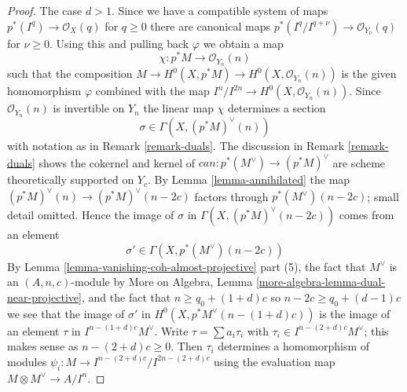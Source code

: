 \documentclass{stacks-project}
\theoremstyle{plain}
\theoremstyle{definition}
\theoremstyle{remark}
\numberwithin{equation}{subsection}
\begin{document}
\begin{proof}
The case $d > 1$. Since we have a compatible system of maps
$p^*(I^q) \to \mathcal{O}_X(q)$ for $q \geq 0$ there are canonical maps
$p^*(I^q/I^{q + \nu}) \to \mathcal{O}_{Y_\nu}(q)$ for $\nu \geq 0$.
Using this and pulling back $\varphi$ we obtain a map
$$
\chi : p^*M \longrightarrow \mathcal{O}_{Y_n}(n)
$$
such that the composition
$M \to H^0(X, p^*M) \to H^0(X, \mathcal{O}_{Y_n}(n))$
is the given homomorphism $\varphi$ combined with the
map $I^n/I^{2n} \to H^0(X, \mathcal{O}_{Y_n}(n))$.
Since $\mathcal{O}_{Y_n}(n)$ is invertible on $Y_n$ the
linear map $\chi$ determines a section
$$
\sigma \in \Gamma(X, (p^*M)^\vee(n))
$$
with notation as in Remark \ref{remark-duals}.
The discussion in Remark \ref{remark-duals} shows
the cokernel and kernel of $can : p^*(M^\vee) \to (p^*M)^\vee$
are scheme theoretically supported on $Y_c$. By
Lemma \ref{lemma-annihilated} the map
$(p^*M)^\vee(n) \to (p^*M)^\vee(n - 2c)$ factors
through $p^*(M^\vee)(n - 2c)$; small detail omitted.
Hence the image of $\sigma$ in $\Gamma(X, (p^*M)^\vee(n - 2c))$
comes from an element
$$
\sigma' \in \Gamma(X, p^*(M^\vee)(n - 2c))
$$
By Lemma \ref{lemma-vanishing-coh-almost-projective} part (5),
the fact that $M^\vee$ is an $(A, n, c)$-module by
More on Algebra, Lemma \ref{more-algebra-lemma-dual-near-projective},
and the fact that $n \geq q_0 + (1 + d)c$ so $n - 2c \geq q_0 + (d - 1)c$
we see that the image of $\sigma'$ in $H^0(X, p^*M^\vee(n - (1 + d)c))$
is the image of an element $\tau$ in $I^{n - (1 + d)c}M^\vee$.
Write $\tau = \sum a_i \tau_i$ with $\tau_i \in I^{n - (2 + d)c}M^\vee$;
this makes sense as $n - (2 + d)c \geq 0$.
Then $\tau_i$ determines a homomorphism of modules
$\psi_i : M \to I^{n - (2 + d)c}/I^{2n - (2 + d)c}$
using the evaluation map $M \otimes M^\vee \to A/I^n$.


\end{proof}
\end{document}
